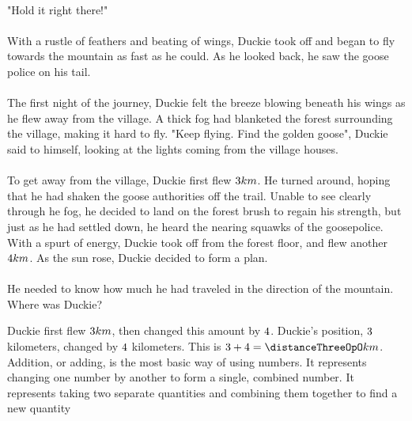 \paragraph{} "Hold it right there!"
\paragraph{} With a rustle of feathers and beating of wings, Duckie took off and began to fly towards the mountain as fast as he could. As he looked back, he saw the goose police on his tail. 
\vfill
\pagebreak
{\paragraph{} The first night of the journey, Duckie felt the breeze blowing beneath his wings as he flew away from the village. A thick fog had blanketed the forest surrounding the village, making it hard to fly. "Keep flying. Find the golden goose", Duckie said to himself, looking at the lights coming from the village houses. 
\paragraph{} To get away from the village, Duckie first flew $3 km$. He turned around, hoping that he had shaken the goose authorities off the trail. Unable to see clearly through he fog, he decided to land on the forest brush to regain his strength, but just as he had settled down, he heard the nearing squawks of the goosepolice. With a spurt of energy, Duckie took off from the forest floor, and flew another $4 km$. As the sun rose, Duckie decided to form a plan. 
\paragraph{} He needed to know how much he had traveled in the direction of the mountain. Where was Duckie?}
{Duckie first flew $3 km$, then changed this amount by $4$. Duckie's position, $3$ kilometers, changed by $4$ kilometers. This is $\distanceOneOpO + \distanceTwoOpO = \distanceThreeOpO km$.}
{Addition, or adding, is the most basic way of using numbers. It represents changing one number by another to form a single, combined number. It represents taking two separate quantities and combining them together to find a new quantity} 
{}
